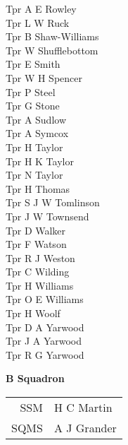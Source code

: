 \begin{multicols}{3}
  Tpr A E Rowley \\
  Tpr L W Ruck \\
  Tpr B Shaw-Williams \\
  Tpr W Shufflebottom \\
  Tpr E Smith \\
  Tpr W H Spencer \\
  Tpr P Steel \\
  Tpr G Stone \\
  Tpr A Sudlow \\
  Tpr A Symcox \\
  Tpr H Taylor \\
  Tpr H K Taylor \\
  Tpr N Taylor \\
  Tpr H Thomas \\
  Tpr S J W Tomlinson \\
  Tpr J W Townsend \\
  Tpr D Walker \\
  Tpr F Watson \\
  Tpr R J Weston \\
  Tpr C Wilding \\
  Tpr H Williams \\
  Tpr O E Williams \\
  Tpr H Woolf \\
  Tpr D A Yarwood \\
  Tpr J A Yarwood \\
  Tpr R G Yarwood \\
\end{multicols}

\pagebreak

\begin{center}
  \Large
  \textbf{B Squadron}
\end{center}

\begin{center}
  \begin{tabular}{rl}
    SSM & H C Martin \\
    SQMS & A J Grander \\
  \end{tabular}
\end{center}

